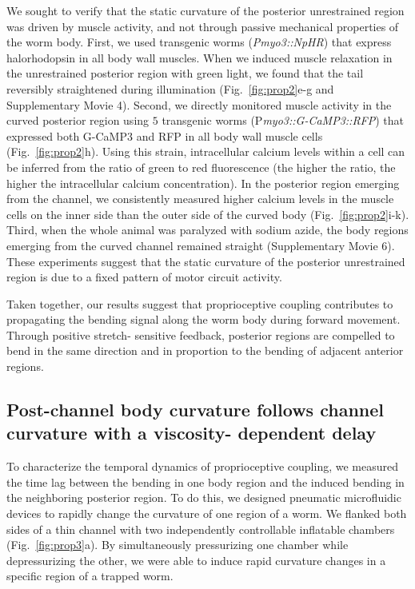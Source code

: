 We sought to verify that the static curvature of the posterior unrestrained region was driven by 
muscle activity, and not through passive mechanical properties of the worm body. First, we used 
transgenic worms (\textit{Pmyo3::NpHR}) that express halorhodopsin \citep{han_multiple-color_2007} in all body wall muscles. 
When we induced muscle relaxation in the unrestrained posterior region with green light, we 
found that the tail reversibly straightened during illumination (Fig.~\ref{fig:prop2}e-g and Supplementary 
Movie 4). Second, we directly monitored muscle activity in the curved posterior region using 
 $5$
transgenic worms (P\textit{myo3::G-CaMP3::RFP}) that expressed both G-CaMP3 and RFP in all body 
wall muscle cells (Fig.~\ref{fig:prop2}h). Using this strain, intracellular calcium levels within a cell can be 
inferred from the ratio of green to red fluorescence (the higher the ratio, the higher the 
intracellular calcium concentration). In the posterior region emerging from the channel, we 
consistently measured higher calcium levels in the muscle cells on the inner side than the outer 
side of the curved body (Fig.~\ref{fig:prop2}i-k). Third, when the whole animal was paralyzed with sodium 
azide, the body regions emerging from the curved channel remained straight (Supplementary 
Movie 6). These experiments suggest that the static curvature of the posterior unrestrained region 
is due to a fixed pattern of motor circuit activity. 


Taken together, our results suggest that proprioceptive coupling contributes to propagating the 
bending signal along the worm body during forward movement. Through positive stretch- 
sensitive feedback, posterior regions are compelled to bend in the same direction and in 
proportion to the bending of adjacent anterior regions. 
 
\subsection{Post-channel body curvature follows channel curvature with a viscosity- 
dependent delay}
 
To characterize the temporal dynamics of proprioceptive coupling, we measured the time lag 
between the bending in one body region and the induced bending in the neighboring posterior 
region. To do this, we designed pneumatic microfluidic devices to rapidly change the curvature 
of one region of a worm. We flanked both sides of a thin channel with two independently 
controllable inflatable chambers (Fig.~\ref{fig:prop3}a). By simultaneously pressurizing one chamber while 
depressurizing the other, we were able to induce rapid curvature changes in a specific region of a 
trapped worm. 

